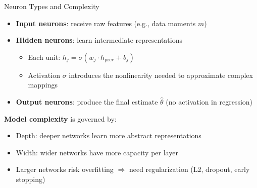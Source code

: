 \documentclass[aspectratio=169,professionalfonts]{beamer}
\newcommand{\hl}[1]{\textbf{\textcolor{UGARed}{#1}}}
\begin{document}
\begin{frame}{Neuron Types and Complexity}
  \begin{itemize}
    \item \hl{Input neurons}: receive raw features (e.g., data moments $m$)
    \item \hl{Hidden neurons}: learn intermediate representations
      \begin{itemize}
        \item Each unit: $h_j = \sigma(w_j \cdot h_{\text{prev}} + b_j)$
        \item Activation $\sigma$ introduces the nonlinearity needed to approximate complex mappings
      \end{itemize}
    \item \hl{Output neurons}: produce the final estimate $\hat\theta$ (no activation in regression)
  \end{itemize}
  \medskip
  \hl{Model complexity} is governed by:
  \begin{itemize}
    \item Depth: deeper networks learn more abstract representations
    \item Width: wider networks have more capacity per layer
    \item Larger networks risk overfitting $\Rightarrow$ need regularization (L2, dropout, early stopping)
  \end{itemize}
\end{frame}
\end{document}
